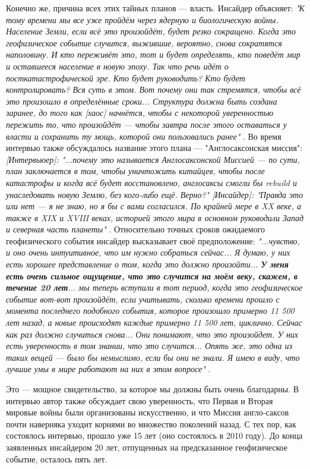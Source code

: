 \documentclass[10pt,twocolumn,letterpaper]{article}
\begin{document}
Конечно же, причина всех этих тайных планов — власть. Инсайдер объясняет: \textit{"К тому времени мы все уже пройдём через ядерную и биологическую войны. Население Земли, если всё это произойдёт, будет резко сокращено. Когда это геофизическое событие случится, выжившие, вероятно, снова сократятся наполовину. И кто переживёт это, тот и будет определять, кто поведёт мир и оставшееся население в новую эпоху. Так что речь идёт о посткатастрофической эре. Кто будет руководить? Кто будет контролировать? Вся суть в этом. Вот почему они так стремятся, чтобы всё это произошло в определённые сроки... Структура должна быть создана заранее, до того как [хаос] начнётся, чтобы с некоторой уверенностью пережить то, что произойдёт — чтобы завтра после этого оставаться у власти и сохранить ту мощь, которой они пользовались ранее"} \cite{4}. Во время интервью также обсуждалось название этого плана — "Англосаксонская миссия": \textit{[Интервьюер]: "...почему это называется Англосаксонской Миссией — по сути, план заключается в том, чтобы уничтожить китайцев, чтобы после катастрофы и когда всё будет восстановлено, англосаксы смогли бы rebuild и унаследовать новую Землю, без кого-либо ещё. Верно?" [Инсайдер]: "Правда это или нет — я не знаю, но я бы с вами согласился. По крайней мере в XX веке, а также в XIX и XVIII веках, историей этого мира в основном руководили Запад и северная часть планеты"} \cite{4}.
Относительно точных сроков ожидаемого геофизического события инсайдер высказывает своё предположение: \textit{"...чувство, и оно очень интуитивное, что им нужно собраться сейчас... Я думаю, у них есть хорошее представление о том, когда это должно произойти... \textbf{У меня есть очень сильное ощущение, что это случится на моём веку, скажем, в течение 20 лет}... мы теперь вступили в тот период, когда это геофизическое событие вот-вот произойдёт, если учитывать, сколько времени прошло с момента последнего подобного события, которое произошло примерно 11 500 лет назад, а новые происходят каждые примерно 11 500 лет, циклично. Сейчас как раз должно случиться снова... Они понимают, что это произойдет. У них есть уверенность в том знании, что это случится... Опять же, это одна из таких вещей — было бы немыслимо, если бы они не знали. Я имею в виду, что лучшие умы в мире работают на них в этом вопросе"} \cite{4}.

Это — мощное свидетельство, за которое мы должны быть очень благодарны. В интервью автор также обсуждает свою уверенность, что Первая и Вторая мировые войны были организованы искусственно, и что Миссия англо-саксов почти наверняка уходит корнями во множество поколений назад. С тех пор, как состоялось интервью, прошло уже 15 лет (оно состоялось в 2010 году). До конца заявленных инсайдером 20 лет, отпущенных на предсказанное геофизическое событие, осталось пять лет.
\end{document}
